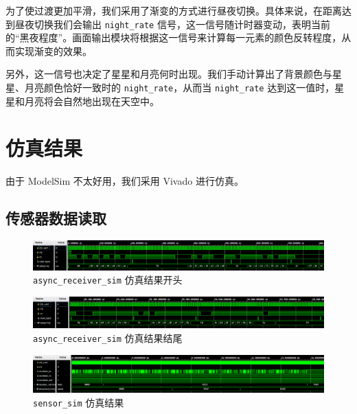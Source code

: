 \documentclass[UTF8, 11pt, fontset=none]{ctexart}
\begin{document}
为了使过渡更加平滑，我们采用了渐变的方式进行昼夜切换。具体来说，在距离达到昼夜切换我们会输出 \texttt{night_rate} 信号，这一信号随计时器变动，表明当前的“黑夜程度”。画面输出模块将根据这一信号来计算每一元素的颜色反转程度，从而实现渐变的效果。

另外，这一信号也决定了星星和月亮何时出现。我们手动计算出了背景颜色与星星、月亮颜色恰好一致时的 \texttt{night_rate}，从而当 \texttt{night_rate} 达到这一值时，星星和月亮将会自然地出现在天空中。

\section{仿真结果}

由于 ModelSim 不太好用，我们采用 Vivado 进行仿真。

\subsection{传感器数据读取}

\begin{figure}[H]
    \centering
    \includegraphics[width=\textwidth]{images/uart-sim-begin.png}
    \vspace{-16pt}
    \caption{\texttt{async_receiver_sim} 仿真结果开头}
\end{figure}

\begin{figure}[H]
    \centering
    \includegraphics[width=\textwidth]{images/uart-sim-end.png}
    \vspace{-16pt}
    \caption{\texttt{async_receiver_sim} 仿真结果结尾}
\end{figure}

\begin{figure}[H]
    \centering
    \includegraphics[width=\textwidth]{images/sensor-sim.png}
    \vspace{-16pt}
    \caption{\texttt{sensor_sim} 仿真结果}
\end{figure}
\end{document}
